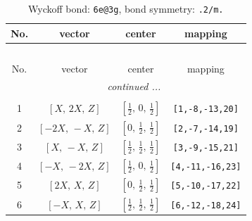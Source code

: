 \documentclass[fleqn,8pt]{jsarticle}
\begin{document}
\renewcommand{\arraystretch}{1.2}
\begin{longtable}{cccc}
\caption{Wyckoff bond: {\tt 6e@3g}, bond symmetry: {\tt .2/m.}}
 \\
 \hline \hline
No. & vector & center & mapping \\ \hline \endfirsthead

\multicolumn{3}{l}{\tablename\ \thetable{}} \\
 \hline \hline
No. & vector & center & mapping \\ \hline \endhead

 \hline \hline
\multicolumn{3}{r}{\footnotesize\it continued ...} \\ \endfoot

 \hline \hline
\multicolumn{3}{r}{} \\ \endlastfoot

1 & $\left[ X,\, 2 X,\, Z \right]$ & $\left[ \frac{1}{2},\, 0,\, \frac{1}{2} \right]$ & {\tt [1,-8,-13,20]} \\ \hline
2 & $\left[ - 2 X,\, - X,\, Z \right]$ & $\left[ 0,\, \frac{1}{2},\, \frac{1}{2} \right]$ & {\tt [2,-7,-14,19]} \\ \hline
3 & $\left[ X,\, - X,\, Z \right]$ & $\left[ \frac{1}{2},\, \frac{1}{2},\, \frac{1}{2} \right]$ & {\tt [3,-9,-15,21]} \\ \hline
4 & $\left[ - X,\, - 2 X,\, Z \right]$ & $\left[ \frac{1}{2},\, 0,\, \frac{1}{2} \right]$ & {\tt [4,-11,-16,23]} \\ \hline
5 & $\left[ 2 X,\, X,\, Z \right]$ & $\left[ 0,\, \frac{1}{2},\, \frac{1}{2} \right]$ & {\tt [5,-10,-17,22]} \\ \hline
6 & $\left[ - X,\, X,\, Z \right]$ & $\left[ \frac{1}{2},\, \frac{1}{2},\, \frac{1}{2} \right]$ & {\tt [6,-12,-18,24]} \\
\end{longtable}
\renewcommand{\arraystretch}{1.2}
\end{document}
